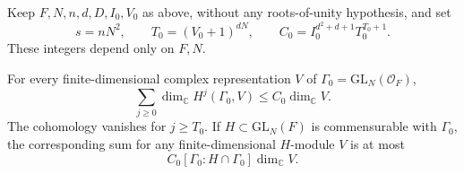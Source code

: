 Keep \(F,N,n,d,D,I_0,V_0\) as above, without any roots-of-unity
hypothesis, and set
\[
 s=nN^2,\qquad T_0=(V_0+1)^{dN},\qquad
 C_0=I_0^{d^2+d+1}T_0^{T_0+1}.
\]
These integers depend only on \(F,N\).

\begin{srproposition}\label{prop:sr-arithmetic-cohomology}
For every finite-dimensional complex representation \(V\) of
\(\Gamma_0=\mathrm{GL}_N(\mathcal O_F)\),
\begin{equation}\label{eq:sr-arithmetic-cohomology}
 \sum_{j\geq0}\dim_{\mathbb C}H^j(\Gamma_0,V)
                                      \leq C_0\dim_{\mathbb C}V.
\end{equation}
The cohomology vanishes for \(j\geq T_0\).
If \(H\subset\mathrm{GL}_N(F)\) is commensurable with \(\Gamma_0\),
the corresponding sum for any finite-dimensional \(H\)-module \(V\)
is at most
\[
 C_0[\Gamma_0:H\cap\Gamma_0]\dim_{\mathbb C}V.
\]
\end{srproposition}
